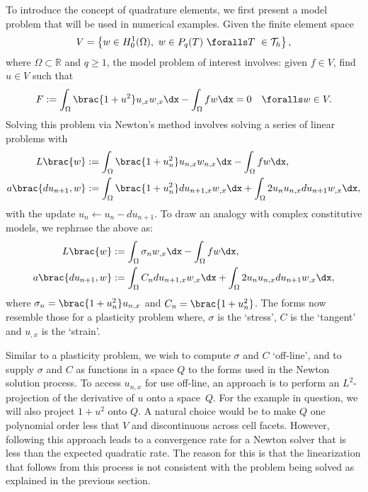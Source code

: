 To introduce the concept of quadrature elements, we first present a
model problem that will be used in numerical examples. Given the finite
element space
%
\begin{equation}
  V = \left\{ w \in H^{1}_{0}(\Omega), \ w \in P_{q}(T) \ \foralls T \ \in \mathcal{T}_h \right\},
\end{equation}
%
where $\Omega \subset \mathbb{R}$ and $q \ge 1$, the model problem of
interest involves: given $f \in V$, find $u \in V$ such that
%
\begin{equation}
  F := \int_{\Omega} \brac{1 + u^2} u_{,x} w_{,x} \dx
            - \int_{\Omega} f w \dx
    = 0 \quad \foralls w \in V.
\label{eq:oelgaard-1:plas_nonlinear_poisson}
\end{equation}
%
Solving this problem via Newton's method involves solving a series of
linear problems with
%
\begin{align}
L\brac{w}
   &:= \int_{\Omega} \brac{1 + u^{2}_{n}} u_{n,x} w_{n,x} \dx
            - \int_{\Omega} f w \dx,\\
a\brac{du_{n+1}, w}
   &:= \int_{\Omega} \brac{1 + u^{2}_{n}} du_{n+1, x} w_{,x} \dx
        + \int_{\Omega} 2u_{n}u_{n,x} du_{n+1} w_{,x} \dx,
\label{eq:oelgaard-1:plas_nonlinear_poisson_forms}
\end{align}
%
with the update $u_{n} \leftarrow u_{n} - du_{n+1}$.  To draw an analogy
with complex constitutive models, we rephrase the above as:
%
\begin{align}
L\brac{w}
   &:= \int_{\Omega} \sigma_{n} w_{,x} \dx - \int_{\Omega} f w \dx,
\\
a\brac{du_{n+1}, w}
   &:=  \int_{\Omega} C_{n} du_{n+1, x} w_{,x} \dx
      + \int_{\Omega} 2u_{n}u_{n,x} du_{n+1} w_{,x} \dx,
\label{eq:oelgaard-1:plas_nonlinear_poisson_forms2}
\end{align}
%
where $\sigma_{n} = \brac{1 + u^{2}_{n}} u_{n, x}$ and $C_{n} = \brac{1
+ u^{2}_{n}}$.  The forms now resemble those for a plasticity problem
where, $\sigma$ is the `stress', $C$ is the `tangent' and $u_{,x}$ is the
`strain'.

Similar to a plasticity problem, we wish to compute $\sigma$ and $C$
`off-line', and to supply $\sigma$ and $C$ as functions in a space $Q$
to the forms used in the Newton solution process. To access $u_{n ,x}$
for use off-line, an approach is to perform an $L^{2}$-projection of
the derivative of $u$ onto a space~$Q$.  For the example in question,
we will also project $1 + u^{2}$ onto $Q$.  A natural choice would be
to make $Q$ one polynomial order less that $V$ and discontinuous across
cell facets.  However, following this approach leads to a convergence
rate for a Newton solver that is less than the expected quadratic rate.
The reason for this is that the linearization that follows from this
process is not consistent with the problem being solved as explained in the
previous section.


